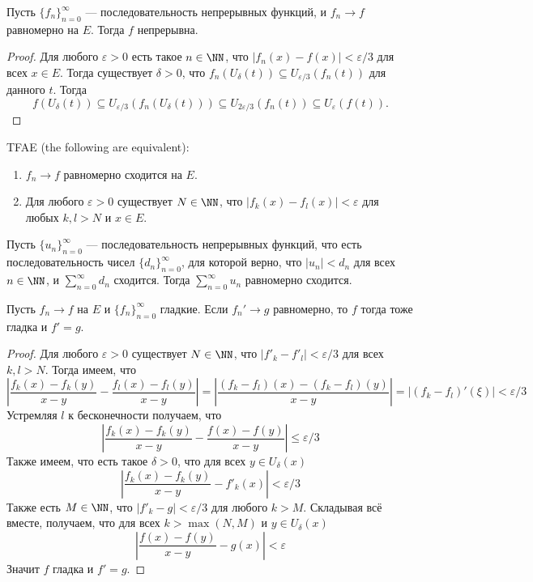 \documentclass[12pt,a4paper]{article}
\begin{document}
    \begin{theorem}
        Пусть $\{f_n\}_{n=0}^\infty$ --- последовательность непрерывных функций, и $f_n \to f$ равномерно на $E$. Тогда $f$ непрерывна.
    \end{theorem}

    \begin{proof}
        Для любого $\varepsilon > 0$ есть такое $n \in \NN$, что $|f_n(x) - f(x)| < \varepsilon/3$ для всех $x \in E$. Тогда существует $\delta > 0$, что $f_n(U_\delta(t)) \subseteq U_{\varepsilon/3}(f_n(t))$ для данного $t$. Тогда
        \[f(U_\delta(t)) \subseteq U_{\varepsilon/3}(f_n(U_\delta(t))) \subseteq U_{2\varepsilon/3}(f_n(t)) \subseteq U_\varepsilon(f(t)).\]
    \end{proof}

    \begin{theorem}[Коши]
        TFAE (the following are equivalent):
        \begin{enumerate}
            \item $f_n \to f$ равномерно сходится на $E$.
            \item Для любого $\varepsilon > 0$ существует $N \in \NN$, что $|f_k(x) - f_l(x)| < \varepsilon$ для любых $k, l > N$ и $x \in E$.
        \end{enumerate}
    \end{theorem}

    \begin{theorem}[Вейерштрасс]
        Пусть $\{u_n\}_{n=0}^\infty$ --- последовательность непрерывных функций, что есть последовательность чисел $\{d_n\}_{n=0}^\infty$, для которой верно, что $|u_n| < d_n$ для всех $n \in \NN$, и $\sum_{n=0}^\infty d_n$ сходится. Тогда $\sum_{n=0}^\infty u_n$ равномерно сходится.
    \end{theorem}

    \begin{theorem}
        Пусть $f_n \to f$ на $E$ и $\{f_n\}_{n=0}^\infty$ гладкие. Если $f_n' \to g$ равномерно, то $f$ тогда тоже гладка и $f' = g$.
    \end{theorem}

    \begin{proof}
        Для любого $\varepsilon > 0$ существует $N \in \NN$, что $|f'_k - f'_l| < \varepsilon/3$ для всех $k, l > N$. Тогда имеем, что
        \[\left|\frac{f_k(x) - f_k(y)}{x - y} - \frac{f_l(x) - f_l(y)}{x - y}\right| = \left| \frac{(f_k - f_l)(x) - (f_k - f_l)(y)}{x - y} \right| = |(f_k - f_l)'(\xi)| < \varepsilon/3 \]
        Устремляя $l$ к бесконечности получаем, что
        \[\left|\frac{f_k(x) - f_k(y)}{x - y} - \frac{f(x) - f(y)}{x - y}\right| \leqslant \varepsilon/3\]
        Также имеем, что есть такое $\delta > 0$, что для всех $y \in U_\delta(x)$
        \[\left|\frac{f_k(x) - f_k(y)}{x - y} - f'_k(x)\right| < \varepsilon/3\]
        Также есть $M \in \NN$, что $|f'_k - g| < \varepsilon/3$ для любого $k > M$. Складывая всё вместе, получаем, что для всех $k > \max(N, M)$ и $y \in U_\delta(x)$
        \[\left|\frac{f(x) - f(y)}{x - y} - g(x)\right| < \varepsilon\]
        Значит $f$ гладка и $f' = g$.
    \end{proof}
\end{document}

